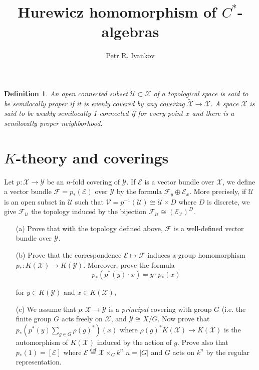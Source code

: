 \documentclass{beamer}
\title{Hurewicz homomorphism of $C^*$-algebras}
\institute
{
 Algebras in analisys
}
\author{Petr R. Ivankov  }
\theoremstyle{plain}
\newtheorem{defn}{Definition}
\newcommand{\E}{\mathcal{E}}                 %
\newcommand{\F}{\mathcal{F}}                 %
\newcommand{\sU}{\mathcal{U}}       %
\newcommand{\sV}{\mathcal{V}}       %
\newcommand{\sX}{\mathcal{X}}       %
\newcommand{\sY}{\mathcal{Y}}       %
\newcommand{\bydef}{\stackrel{\mathrm{def}}{=}}
\begin{document}
\begin{frame}
  \titlepage
\end{frame}
\begin{frame}
\begin{defn}
	An open connected subset $\sU\subset \sX$ of a topological space is said to be \alert{semilocally proper} if it is evenly covered by any covering $\widetilde{\sX}\to\sX$.
	A space $\sX$ is said to be \alert{weakly semilocally 1-connected} if for  every point $x$ and there is a semilocally proper neighborhood.
\end{defn} 
\end{frame}
\section{$K$-theory and coverings}

	Let $p : \sX \to \sY$ be an $n$-fold covering of $\sY$. If $\E$ is a vector bundle over $\sX$, we 
	define a vector bundle $\F = p_*\left( \E\right) $ over $\sY$ by the formula $\F_y \oplus \E_x$. More precisely, if $\sU$ is an open subset in $\sU$ such that $\sV = p^{-1}\left(\sU \right) \cong \sU \times D$ where $D$ is 
	discrete, we give $\F_\sU$ the topology induced by the bijection $\F_\sU \cong \left(\E_\sV \right)^D$.
	\begin{enumerate}
		\item[(a)] Prove that with the topology defined above, $\F$ is a well-defined vector 
		bundle over $\sY$. 
		\item[(b)] Prove that the correspondence $\E \mapsto \F$ induces a group homomorphism 
		$p_*:K\left(\sX \right) \to K\left(\sY \right)$. Moreover, prove the formula 
		$$
		p_*\left(p^*\left(y \right)\cdot x  \right) = y \cdot p_*\left(x \right) 
		$$
		
		for $y\in K\left( \sY\right)$ and $x \in K\left(\sX \right)$,
		\item[(c)]   We assume that $p : \sX \to \sY$ is a \textit{principal} covering with group $G$ (i.e. the finite 	group $G$ acts freely on $\sX$, and $\sY \cong X/G$. Now prove that $p_*\left(p^*\left(y \right)\sum_{g \in G}\rho\left( g\right)^*\right) \left( x\right)$  
		where $\rho\left( g\right)^*K\left(\sX \right)\to K\left(\sX \right)$ is the automorphism of $K\left(\sX \right)$  induced by the action of 	$g$. Prove also that $p_*\left(1 \right)  = \left[\E\right]$ where $\E \bydef \sX \times_G k^n$ $n = \left|G \right|$  and $G$ acts 
		on $k^n$ by the regular representation. 
		
	\end{enumerate} 
\end{document}
